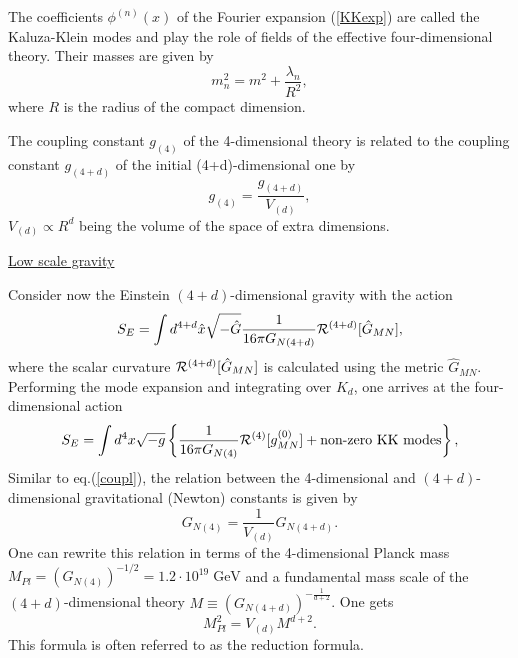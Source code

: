 \documentclass{cernyrep}
\begin{document}
The coefficients $\phi^{(n)}(x)$ of the Fourier expansion
(\ref{KKexp}) are called the Kaluza-Klein modes and play the role
of fields of the effective four-dimensional theory. Their masses
are given by
\begin{equation}\label{mass}
  m_{n}^{2} = m^{2} + \frac{\lambda_{n}}{R^{2}},
\end{equation}
where $R$ is the radius of the compact dimension.

 The coupling constant $g_{(4)}$ of the 4-dimensional theory
is related to the coupling constant $g_{(4+d)}$ of the initial
(4+d)-dimensional one by
\begin{equation}\label{coupl}
  g_{(4)} = \frac{g_{(4+d)}}{V_{(d)}},
\end{equation}
$V_{(d)}\propto R^{d}$ being the volume of the space of extra
dimensions.

\underline{Low scale gravity}

Consider now the Einstein $(4+d)$-dimensional gravity with the
action
\[
S_{E} = \int d^{4+d}\hat{x} \sqrt{-\hat{G}} \frac{1}{16 \pi
G_{N(4+d)}} {\cal R}^{(4+d)} [\hat{G}_{MN}],
\]
where the scalar curvature ${\cal R}^{(4+d)} [\hat{G}_{MN}]$ is
calculated using the metric $\hat{G}_{MN}$. Performing the mode
expansion and integrating over $K_{d}$, one arrives at the
four-dimensional action
\[
S_{E} = \int d^{4}x \sqrt{-g} \left\{ \frac{1}{16 \pi G_{N(4)}}
{\cal R}^{(4)} [g^{(0)}_{MN}] + \mbox{non-zero KK modes} \right\},
\]
 Similar to eq.(\ref{coupl}), the relation between the 4-dimensional and
$(4+d)$-dimensional gravitational (Newton) constants is given by
\begin{equation}\label{G-rel}
  G_{N(4)} = \frac{1}{V_{(d)}} G_{N(4+d)}.
\end{equation}
One can rewrite this relation in terms of the 4-dimensional Planck
mass $M_{Pl} = (G_{N(4)})^{-1/2} = 1.2 \cdot 10^{19}\; \mbox{GeV}$
and a fundamental mass scale of the $(4+d)$-dimensional theory $M
\equiv (G_{N(4+d)})^{-\frac{1}{d+2}}$. One gets
\begin{equation}\label{M-rel}
  M_{Pl}^{2} = V_{(d)} M^{d+2}.
\end{equation}
This formula is often referred to as the reduction formula.
\end{document}
